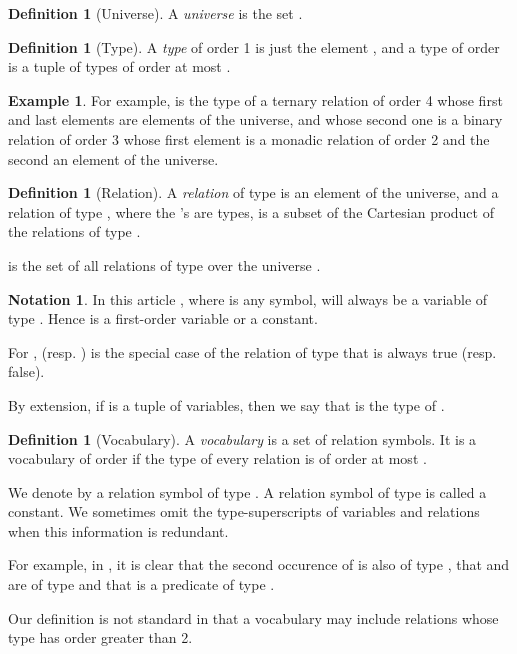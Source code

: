 \documentclass[a4paper,12pt]{article}
\newcommand{\emphdex}[1]{\index{#1}\emph{#1}}
\theoremstyle{definition}
\newtheorem{example}[theorem]{Example}
\newtheorem{definition}[theorem]{Definition}
\newtheorem{notation}[theorem]{Notation}
\begin{document}
\begin{definition}[Universe]
  A \emphdex{universe}  is the set .
\end{definition}
\begin{definition}[Type]\label{type}
  A \emphdex{type} of order 1 is just the element , and a type of
  order  is a tuple of types of order at most .
\end{definition}
\begin{example}For example,  is the
  type of a ternary relation of order 4 whose first and last elements
  are elements of the universe, and whose second one is a binary
  relation of order 3 whose first element is a monadic relation of
  order 2 and the second an element of the universe.
\end{example}
\begin{definition}[Relation]
  A \emphdex{relation} of type  is an element of the universe,
  and a relation of type , where the 's
  are types, is a subset of the Cartesian product of the relations of
  type .

   is the set of all relations of type  over the
  universe .
\end{definition}
\begin{notation}
  In this article , where  is any symbol, will
  always be a variable of type . Hence  is a
  first-order variable or a constant.

  For ,  (resp.  ) is the special case
  of the relation of type  that is always
  true (resp. false). 
\end{notation}

By extension, if 
is a tuple of variables, then we say that  is
the type of . 

\begin{definition}[Vocabulary]
  A \emphdex{vocabulary}  is a set of
  relation symbols.   It is a vocabulary of order
   if the type of every relation is of order at most .

  We denote by  a relation symbol of type . A relation
  symbol of type  is called a constant. We sometimes omit the
  type-superscripts of variables and relations when this information
  is redundant. 
\end{definition}
For example, in , it is clear that the second occurence of  is also of
type , that  and  are of type  and that
 is a predicate of type .

Our definition is not standard in that a vocabulary may include
relations whose type has order greater than 2.
\end{document}
